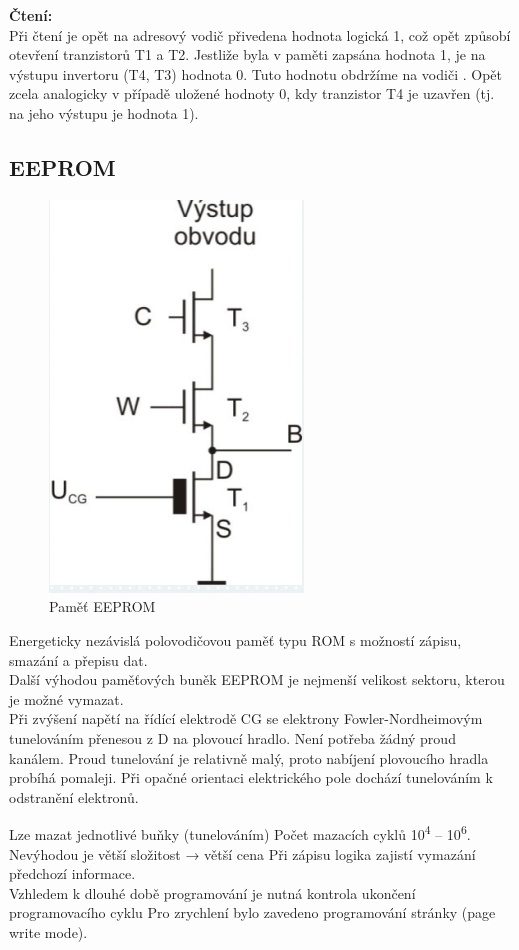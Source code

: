 \textbf{Čtení:}\\
Při čtení je opět na adresový vodič přivedena hodnota logická 1, což opět způsobí otevření tranzistorů T1 a T2. Jestliže byla v paměti zapsána hodnota 1, je na výstupu invertoru (T4, T3) hodnota 0. Tuto hodnotu obdržíme na vodiči . Opět zcela analogicky v případě uložené hodnoty 0, kdy tranzistor T4 je uzavřen (tj. na jeho výstupu je hodnota 1). 

\subsection{EEPROM}
   \begin{figure}[h]
   \begin{center}
     \includegraphics[scale=0.6]{images/EEPROM.png}
   \end{center}
   \caption{Paměť EEPROM}
  \end{figure}
Energeticky nezávislá polovodičovou paměť typu ROM s možností zápisu, smazání a přepisu dat.\\
Další výhodou paměťových buněk EEPROM je nejmenší velikost sektoru, kterou je možné vymazat.\\ 
Při zvýšení napětí na řídící elektrodě CG se elektrony Fowler-Nordheimovým tunelováním přenesou z D na plovoucí hradlo. Není potřeba žádný proud kanálem. Proud tunelování je relativně malý, proto nabíjení plovoucího hradla probíhá pomaleji. Při opačné orientaci elektrického pole dochází tunelováním k odstranění elektronů.

Lze mazat jednotlivé buňky (tunelováním) Počet mazacích cyklů 10\textsuperscript{4} – 10\textsuperscript{6}.
Nevýhodou je větší složitost → větší cena Při zápisu logika zajistí vymazání předchozí
informace.\\
Vzhledem k dlouhé době programování je nutná kontrola ukončení programovacího cyklu Pro zrychlení bylo zavedeno programování stránky (page write mode).

